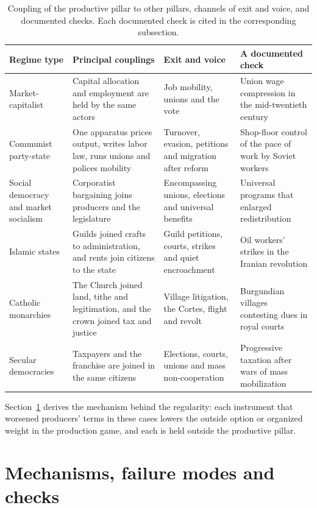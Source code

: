 \documentclass[11pt,letterpaper]{article}
\theoremstyle{definition}
\theoremstyle{remark}
\begin{document}
\begin{table}[p]
\centering
\small
\caption{Coupling of the productive pillar to other pillars, channels of exit and voice, and documented checks. Each documented check is cited in the corresponding subsection.}
\label{tab:regimes2}
\begin{tabularx}{\textwidth}{@{}L{2.6cm}YYY@{}}
\toprule
Regime type & Principal couplings & Exit and voice & A documented check \\
\midrule
Market-capitalist & Capital allocation and employment are held by the same actors & Job mobility, unions and the vote & Union wage compression in the mid-twentieth century \\
Communist party-state & One apparatus prices output, writes labor law, runs unions and polices mobility & Turnover, evasion, petitions and migration after reform & Shop-floor control of the pace of work by Soviet workers \\
Social democracy and market socialism & Corporatist bargaining joins producers and the legislature & Encompassing unions, elections and universal benefits & Universal programs that enlarged redistribution \\
Islamic states & Guilds joined crafts to administration, and rents join citizens to the state & Guild petitions, courts, strikes and quiet encroachment & Oil workers' strikes in the Iranian revolution \\
Catholic monarchies & The Church joined land, tithe and legitimation, and the crown joined tax and justice & Village litigation, the Cortes, flight and revolt & Burgundian villages contesting dues in royal courts \\
Secular democracies & Taxpayers and the franchise are joined in the same citizens & Elections, courts, unions and mass non-cooperation & Progressive taxation after wars of mass mobilization \\
\bottomrule
\end{tabularx}
\end{table}

Section~\ref{sec:mechanisms} derives the mechanism behind the regularity: each instrument that worsened producers' terms in these cases lowers the outside option or organized weight in the production game, and each is held outside the productive pillar.

\section{Mechanisms, failure modes and checks}
\label{sec:mechanisms}
\end{document}
